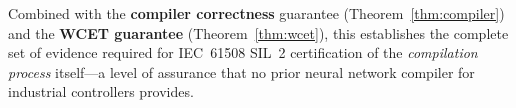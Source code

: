 Combined with the \textbf{compiler correctness} guarantee
(Theorem~\ref{thm:compiler}) and the \textbf{WCET guarantee}
(Theorem~\ref{thm:wcet}), this establishes the complete set of
evidence required for IEC~61508 SIL~2 certification of the
\textit{compilation process} itself---a level of assurance that
no prior neural network compiler for industrial controllers provides.
